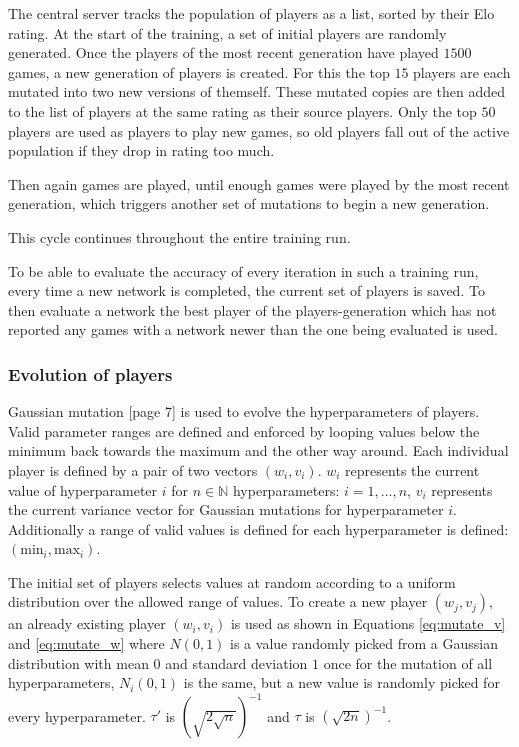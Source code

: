 \documentclass[12pt,onecolumn,oneside,titlepage]{article}
\begin{document}
The central server tracks the population of players as a list, sorted by their Elo rating. 
At the start of the training, a set of initial players are randomly generated.
Once the players of the most recent generation have played $1500$ games, a new generation of players is created. For this the top $15$ players are each mutated into two new versions of themself. These mutated copies are then added to the list of players at the same rating as their source players.
Only the top $50$ players are used as players to play new games, so old players fall out of the active population if they drop in rating too much.

Then again games are played, until enough games were played by the most recent generation, which triggers another set of mutations to begin a new generation.

This cycle continues throughout the entire training run.

To be able to evaluate the accuracy of every iteration in such a training run, every time a new network is completed, the current set of players is saved. 
To then evaluate a network the best player of the players-generation which has not reported any games with a network newer than the one being evaluated is used.

\subsubsection{Evolution of players}

Gaussian mutation \cite{yao1999evolving}[page 7] is used to evolve the hyperparameters of players. Valid parameter ranges are defined and enforced by looping values below the minimum back towards the maximum and the other way around.
Each individual player is defined by a pair of two vectors $(w_i, v_i)$. $w_i$ represents the current value of hyperparameter $i$ for $n \in \mathbb{N}$ hyperparameters: $i = 1, ..., n$, $v_i$ represents the current variance vector for Gaussian mutations for hyperparameter $i$.
Additionally a range of valid values is defined for each hyperparameter is defined: $(\text{min}_i, \text{max}_i)$.

The initial set of players selects values at random according to a uniform distribution over the allowed range of values.
To create a new player $(w_j, v_j)$, an already existing player $(w_i, v_i)$ is used as shown in Equations \ref{eq:mutate_v} and \ref{eq:mutate_w} where $N(0,1)$ is a value randomly picked from a Gaussian distribution with mean $0$ and standard deviation $1$
once for the mutation of all hyperparameters,
$N_i(0,1)$ is the same, but a new value is randomly picked for every hyperparameter. $\tau'$ is $(\sqrt{2\sqrt{n}})^{-1}$ and $\tau$ is $(\sqrt{2n})^{-1}$.
\end{document}
